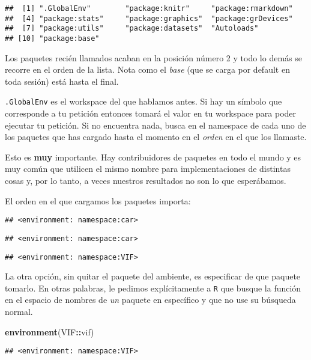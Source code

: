 \documentclass[]{article}
\newenvironment{Shaded}{\begin{snugshade}}{\end{snugshade}}
\newcommand{\KeywordTok}[1]{\textcolor[rgb]{0.13,0.29,0.53}{\textbf{#1}}}
\newcommand{\OperatorTok}[1]{\textcolor[rgb]{0.81,0.36,0.00}{\textbf{#1}}}
\newcommand{\NormalTok}[1]{#1}
\begin{document}
\begin{verbatim}
##  [1] ".GlobalEnv"        "package:knitr"     "package:rmarkdown"
##  [4] "package:stats"     "package:graphics"  "package:grDevices"
##  [7] "package:utils"     "package:datasets"  "Autoloads"        
## [10] "package:base"
\end{verbatim}

Los paquetes recién llamados acaban en la posición número 2 y todo lo
demás se recorre en el orden de la lista. Nota como el \emph{base} (que
se carga por default en toda sesión) está hasta el final.

\texttt{.GlobalEnv} es el workspace del que hablamos antes. Si hay un
símbolo que corresponde a tu petición entonces tomará el valor en tu
workspace para poder ejecutar tu petición. Si no encuentra nada, busca
en el namespace de cada uno de los paquetes que has cargado hasta el
momento en el \emph{orden} en el que los llamaste.

Esto es \textbf{muy} importante. Hay contribuidores de paquetes en todo
el mundo y es muy común que utilicen el mismo nombre para
implementaciones de distintas cosas y, por lo tanto, a veces nuestros
resultados no son lo que esperábamos.

El orden en el que cargamos los paquetes importa:

\begin{verbatim}
## <environment: namespace:car>
\end{verbatim}

\begin{verbatim}
## <environment: namespace:car>
\end{verbatim}

\begin{verbatim}
## <environment: namespace:VIF>
\end{verbatim}

La otra opción, sin quitar el paquete del ambiente, es especificar de
que paquete tomarlo. En otras palabras, le pedimos explícitamente a
\texttt{R} que busque la función en el espacio de nombres de \emph{un}
paquete en específico y que no use su búsqueda normal.

\begin{Shaded}
\begin{Highlighting}[]
\KeywordTok{environment}\NormalTok{(VIF}\OperatorTok{::}\NormalTok{vif)}
\end{Highlighting}
\end{Shaded}

\begin{verbatim}
## <environment: namespace:VIF>
\end{verbatim}
\end{document}
